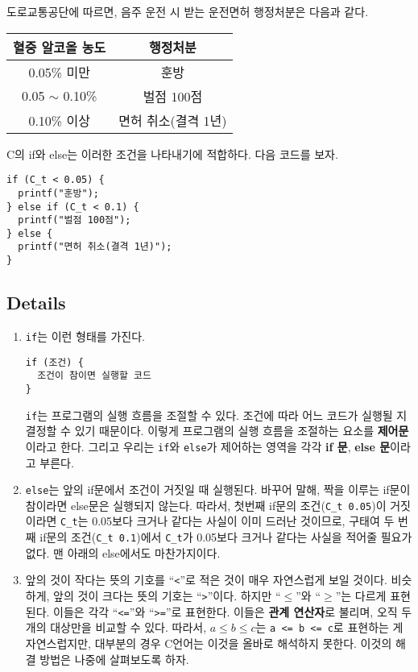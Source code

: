 \documentclass[../main.tex]{subfiles}
\begin{document}
도로교통공단에 따르면, 음주 운전 시 받는 운전면허 행정처분은 다음과 같다.

\begin{tabular}{ c | c }
  혈중 알코올 농도 & 행정처분\\
  \hline
  0.05\% 미만 & 훈방\\
  0.05 $\sim$ 0.10\% & 벌점 100점\\
  0.10\% 이상 & 면허 취소(결격 1년)
\end{tabular}

C의 if와 else는 이러한 조건을 나타내기에 적합하다. 다음 코드를 보자.

\begin{verbatim}
if (C_t < 0.05) {
  printf("훈방");
} else if (C_t < 0.1) {
  printf("벌점 100점");
} else {
  printf("면허 취소(결격 1년)");
}
\end{verbatim}

\subsection{Details}
\begin{enumerate}
\item \texttt{if}는 이런 형태를 가진다.
\begin{verbatim}
if (조건) {
  조건이 참이면 실행할 코드
}
\end{verbatim}
  \texttt{if}는 프로그램의 실행 흐름을 조절할 수 있다. 조건에 따라 어느
  코드가 실행될 지 결정할 수 있기 때문이다. 이렇게 프로그램의 실행
  흐름을 조절하는 요소를 \textbf{제어문}이라고 한다. 그리고 우리는
  \texttt{if}와 \texttt{else}가 제어하는 영역을 각각 \textbf{if 문},
  \textbf{else 문}이라고 부른다.
\item \texttt{else}는 앞의 if문에서 조건이 거짓일 때 실행된다. 바꾸어
  말해, 짝을 이루는 if문이 참이라면 else문은 실행되지 않는다. 따라서,
  첫번째 if문의 조건(\texttt{C\_t \textlangle{} 0.05})이 거짓이라면
  \texttt{C\_t}는 0.05보다 크거나 같다는 사실이 이미 드러난 것이므로,
  구태여 두 번째 if문의 조건(\texttt{C\_t \textlangle{} 0.1})에서
  \texttt{C\_t}가 0.05보다 크거나 같다는 사실을 적어줄 필요가 없다. 맨
  아래의 else에서도 마찬가지이다.
\item 앞의 것이 작다는 뜻의 기호를 ``\verb|<|''로 적은 것이 매우
  자연스럽게 보일 것이다. 비슷하게, 앞의 것이 크다는 뜻의 기호는
  ``\verb|>|''이다. 하지만 ``$\leq$''와 ``$\geq$''는 다르게
  표현된다. 이들은 각각 ``\verb|<=|''와 ``\verb|>=|''로
  표현한다. 이들은 \textbf{관계 연산자}로 불리며, 오직 두개의 대상만을
  비교할 수 있다. 따라서, $ a \leq b \leq c $는 \verb|a <= b <= c|로
  표현하는 게 자연스럽지만, 대부분의 경우 C언어는 이것을 올바로
  해석하지 못한다. 이것의 해결 방법은 나중에 살펴보도록 하자.
\end{enumerate}
\end{document}
